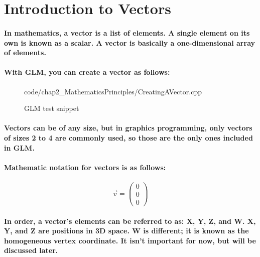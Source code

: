 \section{\textsf{Introduction to Vectors}}
\paragraph{
    In mathematics, a vector is a list of elements. A single element on its own is known as a scalar. A vector is basically a one-dimensional array of elements.
}

\paragraph{
    With GLM, you can create a vector as follows:
}

\begin{frame}{}
    \begin{figure}[ht]
    \centering
    \colorbox{backgroundcolor}{
        \parbox{0.9\textwidth}{
            
            {code/chap2_MathematicsPrinciples/CreatingAVector.cpp}
        }
    }
    \caption{GLM test snippet}
    \label{fig:creatingAVector}
    \end{figure}
\end{frame}

\paragraph{
    Vectors can be of any size, but in graphics programming, only vectors of sizes 2 to 4 are commonly used, so those are the only ones included in GLM.
}

\paragraph{
    Mathematic notation for vectors is as follows:
}

\paragraph{
    \begin{equation*}
    \vec{v} =\begin{pmatrix}
    0\\
    0\\
    0
    \end{pmatrix}
    \end{equation*}
}

\paragraph{
    In order, a vector's elements can be referred to as: X, Y, Z, and W. X, Y, and Z are positions in 3D space. W is different; it is known as the \textbf{homogeneous vertex coordinate}. It isn't important for now, but will be discussed later.
}

